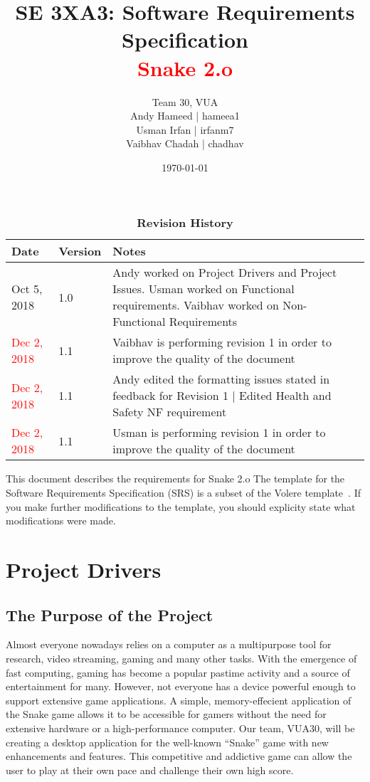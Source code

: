 \documentclass[12pt, titlepage]{article}
\title{SE 3XA3: Software Requirements Specification\\\textcolor{red}{Snake 2.o}}
\author{Team 30, VUA
		\\ Andy Hameed | hameea1
		\\ Usman Irfan | irfanm7
		\\ Vaibhav Chadah | chadhav
}
\date{\today}
\begin{document}
\maketitle

\tableofcontents
\listoftables
\listoffigures

\begin{table}[bp]
\caption{\bf Revision History}
\begin{tabularx}{\textwidth}{p{3cm}p{2cm}X}
\toprule {\bf Date} & {\bf Version} & {\bf Notes}\\
\midrule
Oct 5, 2018 & 1.0 & Andy worked on Project Drivers and Project Issues. Usman worked on Functional requirements. Vaibhav worked on Non-Functional Requirements\\
\textcolor{red}{Dec 2, 2018} & 1.1 & Vaibhav is performing revision 1 in order to improve the quality of the document\\
\textcolor{red}{Dec 2, 2018} & 1.1 & Andy edited the formatting issues stated in feedback for Revision 1 | Edited Health and Safety NF requirement\\
\textcolor{red}{Dec 2, 2018} & 1.1 & Usman is performing revision 1 in order to improve the quality of the document\\
\bottomrule
\end{tabularx}
\end{table}

\newpage


This document describes the requirements for Snake 2.o The template for the Software
Requirements Specification (SRS) is a subset of the Volere
template~\citep{RobertsonAndRobertson2012}.  If you make further modifications
to the template, you should explicity state what modifications were made.

\section{Project Drivers}

\subsection{The Purpose of the Project}

Almost everyone nowadays relies on a computer as a multipurpose tool for research, video streaming, gaming and many other tasks. With the emergence of fast computing, gaming has become a popular pastime activity and a source of entertainment for many. However, not everyone has a device powerful enough to support extensive game applications. A simple, memory-effecient application of the Snake game allows it to be accessible for gamers without the need for extensive hardware or a high-performance computer. Our team, VUA30, will be creating a desktop application for the well-known “Snake” game with new enhancements and features. This competitive and addictive game can allow the user to play at their own pace and challenge their own high score. 
\end{document}
